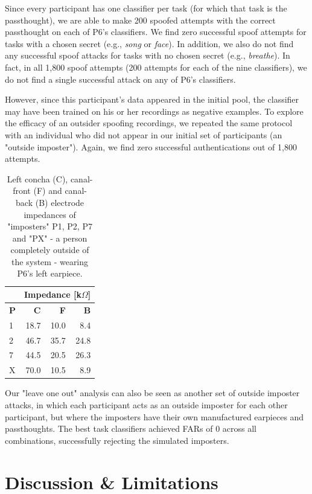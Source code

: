 \documentclass{sigchi}
\begin{document}
Since every participant has one classifier per task (for which that task is the passthought), we are able to make 200 spoofed attempts with the correct passthought on each of P6's classifiers. We find zero successful spoof attempts for tasks with a chosen secret (e.g., \textit{song} or \textit{face}). In addition, we also do not find any successful spoof attacks for tasks with no chosen secret (e.g., \textit{breathe}). In fact, in all 1,800 spoof attempts (200 attempts for each of the nine classifiers), we do not find a single successful attack on any of P6's classifiers.

However, since this participant's data appeared in the initial pool, the classifier may have been trained on his or her recordings as negative examples. To explore the efficacy of an outsider spoofing recordings, we repeated the same protocol with an individual who did not appear in our initial set of participants (an "outside imposter"). Again, we find zero successful authentications out of 1,800 attempts.

\begin{table}[h]
\begin{center}
\begin{tabular}{lrrr}
& \multicolumn{3}{c}{Impedance [k\(\Omega\)]} \\
\hline
\textbf{P} & \textbf{C} & \textbf{F} & \textbf{B} \\
1 & 18.7 & 10.0 & 8.4\\
2 & 46.7 & 35.7 & 24.8\\
7 & 44.5 & 20.5 & 26.3\\
X & 70.0 & 10.5 & 8.9\\
\end{tabular}
\end{center}
\caption{Left concha (C), canal-front (F) and canal-back (B) electrode impedances of "imposters" P1, P2, P7 and "PX" - a person completely outside of the system - wearing P6's left earpiece.}
\label{tab:imposter_impedances}
\end{table}

Our "leave one out" analysis can also be seen as another set of outside imposter attacks, in which each participant acts as an outside imposter for each other participant, but where the imposters have their own manufactured earpieces and passthoughts. The best task classifiers achieved FARs of 0 across all combinations, successfully rejecting the simulated imposters.

\section{Discussion \& Limitations}
\end{document}
